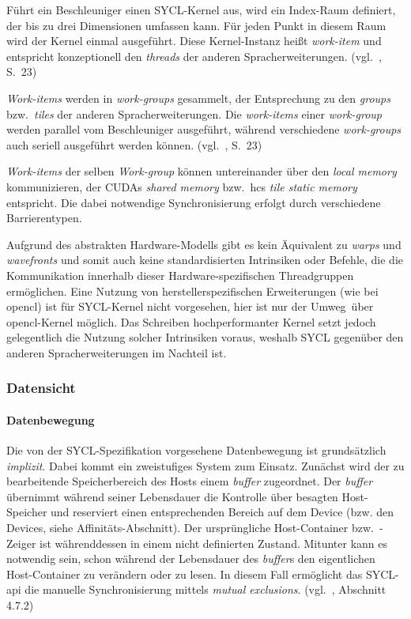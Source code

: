 Führt ein Beschleuniger einen SYCL-Kernel aus, wird ein Index-Raum definiert,
der bis zu drei Dimensionen umfassen kann. Für jeden Punkt in diesem Raum wird
der Kernel einmal ausgeführt. Diese Kernel-Instanz heißt \textit{work-item} und
entspricht konzeptionell den \textit{threads} der anderen Spracherweiterungen.
(vgl.~\cite{syclspec}, S.\ 23)

\textit{Work-items} werden in \textit{work-groups} gesammelt, der Entsprechung
zu den \textit{groups} bzw.\ \textit{tiles} der anderen Spracherweiterungen.
Die \textit{work-items} einer \textit{work-group} werden parallel vom
Beschleuniger ausgeführt, während verschiedene \textit{work-groups} auch seriell
ausgeführt werden können.
(vgl.~\cite{syclspec}, S.\ 23)

\textit{Work-items} der selben \textit{Work-group} können untereinander über
den \textit{local memory} kommunizieren, der CUDAs \textit{shared memory} bzw.\
\gls{hc}s \textit{tile static memory} entspricht. Die dabei notwendige
Synchronisierung erfolgt durch verschiedene Barrierentypen.

Aufgrund des abstrakten Hardware-Modells gibt es kein Äquivalent zu
\textit{warps} und \textit{wavefronts} und somit auch keine standardisierten
Intrinsiken oder Befehle, die die Kommunikation innerhalb dieser
Hardware-spezifischen Threadgruppen ermöglichen. Eine Nutzung von
herstellerspezifischen Erweiterungen (wie bei \gls{opencl}) ist für SYCL-Kernel
nicht vorgesehen, hier ist nur der \glqq Umweg\grqq\ über \gls{opencl}-Kernel
möglich. Das Schreiben hochperformanter Kernel setzt jedoch gelegentlich die
Nutzung solcher Intrinsiken voraus, weshalb SYCL gegenüber den anderen
Spracherweiterungen im Nachteil ist.

\subsubsection{Datensicht}

\paragraph{Datenbewegung}

Die von der SYCL-Spezifikation vorgesehene Datenbewegung ist grundsätzlich
\textit{implizit}. Dabei kommt ein zweistufiges System zum Einsatz. Zunächst
wird der zu bearbeitende Speicherbereich des Hosts einem \textit{buffer}
zugeordnet. Der \textit{buffer} übernimmt während seiner Lebensdauer die
Kontrolle über besagten Host-Speicher und reserviert einen entsprechenden
Bereich auf dem Device (bzw. den Devices, siehe Affinitäts-Abschnitt). Der
ursprüngliche Host-Container bzw.\ -Zeiger ist währenddessen in einem nicht
definierten Zustand. Mitunter kann es notwendig sein, schon während der
Lebensdauer des \textit{buffer}s den eigentlichen Host-Container zu verändern
oder zu lesen. In diesem Fall ermöglicht das SYCL-\gls{api} die manuelle
Synchronisierung mittels \textit{mutual exclusions}.
(vgl.~\cite{syclspec}, Abschnitt 4.7.2)

